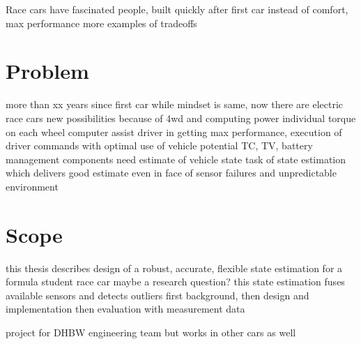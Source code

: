 Race cars have fascinated people, built quickly after first car
instead of comfort, max performance
more examples of tradeoffs

\section{Problem}
more than xx years since first car
while mindset is same, now there are electric race cars
new possibilities because of \gls{4wd} and computing power
individual torque on each wheel
computer assist driver in getting max performance, execution of driver commands with optimal use of vehicle potential
TC, TV, battery management
components need estimate of vehicle state
task of state estimation which delivers good estimate even in face of sensor failures and unpredictable environment

\section{Scope}
this thesis describes design of a robust, accurate, flexible state estimation for a formula student race car
maybe a research question?
this state estimation fuses available sensors and detects outliers
first background, then design and implementation
then evaluation with measurement data

project for DHBW engineering team but works in other cars as well
